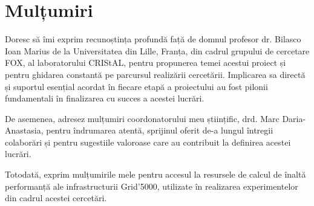 \documentclass[12pt]{report}
\begin{document}
\newpage

\section*{Mulțumiri}

Doresc să îmi exprim recunoștința profundă față de domnul profesor dr. Bilasco Ioan Marius de la Universitatea din Lille, Franța, din cadrul grupului de cercetare FOX, al laboratorului CRIStAL, pentru propunerea temei acestui proiect și pentru ghidarea constantă pe parcursul realizării cercetării. Implicarea sa directă și suportul esențial acordat în fiecare etapă a proiectului au fost pilonii fundamentali în finalizarea cu succes a acestei lucrări.

De asemenea, adresez mulțumiri coordonatorului meu științific, drd. Marc Daria-Anastasia, pentru îndrumarea atentă, sprijinul oferit de-a lungul întregii colaborări și pentru sugestiile valoroase care au contribuit la definirea acestei lucrări.

Totodată, exprim mulțumirile mele pentru accesul la resursele de calcul de înaltă performanță ale infrastructurii Grid'5000, utilizate în realizarea experimentelor din cadrul acestei cercetări.

\tableofcontents


\newpage
{}




%








\end{document}
